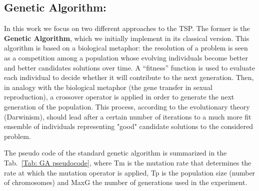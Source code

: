 \subsection{Genetic Algorithm:}
In this work we focus on two different approaches to the TSP.
The former is the \textbf{Genetic Algorithm}, which we initially implement in its classical version.
This algorithm is based on a biological metaphor: the resolution of a problem is seen as a competition among a population whose evolving individuals become better and better candidates solutions over time. 
A “fitness” function is used to evaluate each individual to decide whether it will contribute to the next
generation. 
Then, in analogy with the biological metaphor (the gene transfer in sexual reproduction), a crossover operator is applied in order to generate the next generation of the population.
This process, according to the evolutionary theory (Darwinism), should lead after a certain number of iterations to a much more fit ensemble of individuals representing "good" candidate solutions to the considered problem.

The pseudo code of the standard genetic algorithm is summarized in the Tab.~\ref{Tab: GA pseudocode}, where Tm is the mutation rate that determines the rate at which the mutation operator is applied, Tp is the population size (number of
chromosomes) and MaxG the number of generations used in the experiment\cite{venti}.

